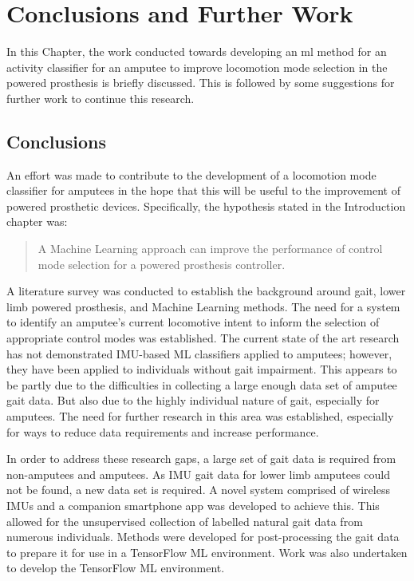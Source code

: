 \chapter{Conclusions and Further Work}
\label{chp:conclusions}
In this Chapter, the work conducted towards developing an \acrshort{ml} method for an activity classifier for an amputee to improve locomotion mode selection in the powered prosthesis is briefly discussed. This is followed by some suggestions for further work to continue this research.

\section{Conclusions} %
An effort was made to contribute to the development of a locomotion mode classifier for amputees in the hope that this will be useful to the improvement of powered prosthetic devices. Specifically, the hypothesis stated in the Introduction chapter was:

\begin{quote}
    A Machine Learning approach can improve the performance of control mode selection for a powered prosthesis controller.
\end{quote}

A literature survey was conducted to establish the background around gait, lower limb powered prosthesis, and Machine Learning methods. The need for a system to identify an amputee's current locomotive intent to inform the selection of appropriate control modes was established. The current state of the art research has not demonstrated IMU-based ML classifiers applied to amputees; however, they have been applied to individuals without gait impairment. This appears to be partly due to the difficulties in collecting a large enough data set of amputee gait data. But also due to the highly individual nature of gait, especially for amputees. The need for further research in this area was established, especially for ways to reduce data requirements and increase performance.

In order to address these research gaps, a large set of gait data is required from non-amputees and amputees. As IMU gait data for lower limb amputees could not be found, a new data set is required. A novel system comprised of wireless IMUs and a companion smartphone app was developed to achieve this. This allowed for the unsupervised collection of labelled natural gait data from numerous individuals. Methods were developed for post-processing the gait data to prepare it for use in a TensorFlow ML environment. Work was also undertaken to develop the TensorFlow ML environment.


